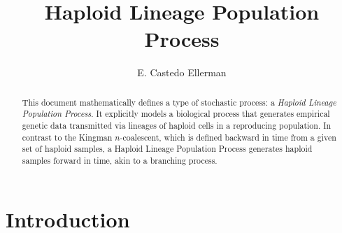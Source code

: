 

\usepackage{draftwatermark}

\title{Haploid Lineage Population Process}
\author{E. Castedo Ellerman }


\maketitle
\linenumbers

\newcommand{\mathstop}{\text{.}}

\newcommand{\Birth}{\mathrm{Birth}}
\newcommand{\Death}{\mathrm{Death}}
\newcommand{\Time}{\mathrm{Time}}
\newcommand{\Place}{\mathrm{Place}}
\newcommand{\Hap}{\mathrm{Hap}}
\newcommand{\Loc}{\mathrm{Loc}}
\newcommand{\Site}{\mathrm{Site}}
\newcommand{\Lin}{\mathrm{Lin}}
\newcommand{\Tree}{\mathrm{Tree}}
\newcommand{\Tip}{\mathrm{Tip}}
\newcommand{\Pop}{\mathrm{Pop}}
\newcommand{\Pred}{\mathrm{Pred}}
\newcommand{\Shift}{\mathrm{Shift}}

\newcommand{\Lega}{\mathrm{Legacy}}
\newcommand{\Nodes}{\mathrm{Nodes}}


\begin{abstract}
This document mathematically defines a type of stochastic process: a \emph{Haploid
  Lineage Population Process}.
It explicitly models a biological process that generates empirical genetic data
  transmitted via lineages of haploid cells in a reproducing population.
In contrast to the Kingman $n$-coalescent,
  which is defined backward in time from a given set of haploid samples,
  a Haploid Lineage Population Process generates haploid samples forward in time,
  akin to a branching process.
\end{abstract}


\section{Introduction}

